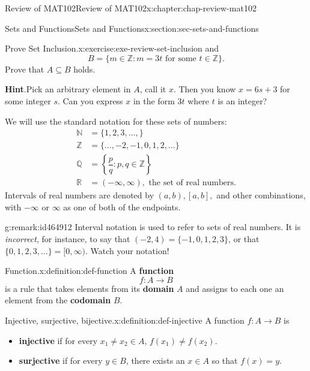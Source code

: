 \documentclass[oneside,10pt,]{book}
\newcommand{\blocktitlefont}{\relax}
\newcommand{\terminology}[1]{\textbf{#1}}
\numberwithin{equation}{section}
\newcommand{\amp}{&}
\begin{document}
\begin{chapterptx}{Review of MAT102}{}{Review of MAT102}{}{}{x:chapter:chap-review-mat102}
\begin{sectionptx}{Sets and Functions}{}{Sets and Functions}{}{}{x:section:sec-sets-and-functions}
\begin{inlineexercise}{Prove Set Inclusion.}{x:exercise:exe-review-set-inclusion}
and%
\begin{equation*}
B = \{m \in \mathbb{Z} : m = 3t \text{ for some } t \in \mathbb{Z}\}\text{.}
\end{equation*}
Prove that \(A \subseteq B\) holds.%
\par\smallskip%
\noindent\textbf{\blocktitlefont Hint}.\hypertarget{g:hint:id438370}{}\quad{}Pick an arbitrary element in \(A\), call it \(x\). Then you know \(x = 6s + 3\) for some integer \(s\). Can you express \(x\) in the form \(3t\) where \(t\) is an integer?%
\end{inlineexercise}
We will use the standard notation for these sets of numbers: \label{g:notation:id464871}\label{g:notation:id464846}\label{g:notation:id464852}\label{g:notation:id464900}\label{g:notation:id464877}%
\begin{align*}
\mathbb{N} \amp = \{1,2,3,\ldots,\}\\
\mathbb{Z} \amp = \{\ldots,-2,-1,0,1,2,\ldots\}\\
\mathbb{Q} \amp = \left\{\dfrac{p}{q} : p,q \in \mathbb{Z}\right\}\\
\mathbb{R} \amp = (-\infty,\infty), \text{ the set of real numbers.}
\end{align*}
Intervals of real numbers are denoted by \((a,b), [a,b],\) and other combinations, with \(-\infty\) or \(\infty\) as one of both of the endpoints.%
\begin{remark}{}{g:remark:id464912}%
Interval notation is used to refer to sets of real numbers. It is \emph{incorrect}, for instance, to say that \((-2,4) = \{-1,0,1,2,3\}\), or that \(\{0,1,2,3,\ldots\} = [0,\infty)\). Watch your notation!%
\end{remark}
\begin{definition}{Function.}{x:definition:def-function}%
\label{g:notation:id464941} A \terminology{function}%
\begin{equation*}
f: A \rightarrow B
\end{equation*}
is a rule that takes elements from its \terminology{domain} \(A\) and assigns to each one an element from the \terminology{codomain} \(B\).%
\end{definition}
\begin{definition}{Injective, surjective, bijective.}{x:definition:def-injective}%
A function \(f: A \rightarrow B\) is%
\begin{itemize}[label=\textbullet]
\item{}\terminology{injective} if for every \(x_1 \ne x_2 \in A\), \(f(x_1) \ne f(x_2)\).%
\item{}\terminology{surjective} if for every \(y \in B\), there exists an \(x \in A\) so that \(f(x) = y\).%

\end{itemize}
\end{definition}
\end{sectionptx}
\end{chapterptx}
\end{document}
